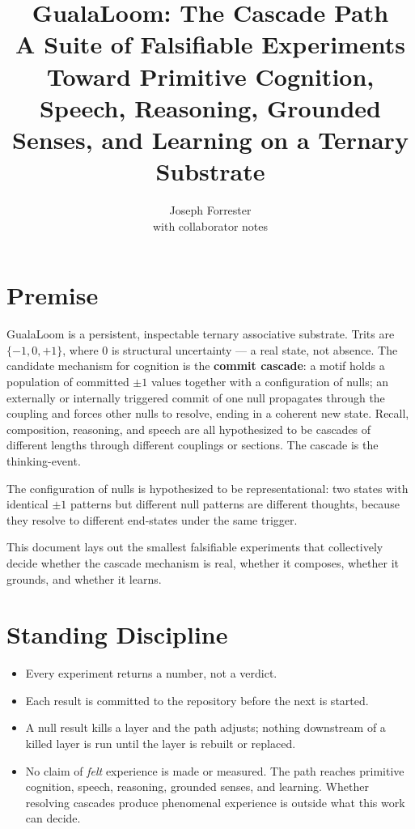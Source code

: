 \documentclass[11pt]{article}
\title{GualaLoom: The Cascade Path \\
\large A Suite of Falsifiable Experiments Toward Primitive Cognition,\\
Speech, Reasoning, Grounded Senses, and Learning on a Ternary Substrate}
\author{Joseph Forrester\\
\small with collaborator notes}
\date{}
\begin{document}
\maketitle

\section*{Premise}

GualaLoom is a persistent, inspectable ternary associative substrate.
Trits are $\{-1, 0, +1\}$, where $0$ is structural uncertainty --- a real
state, not absence. The candidate mechanism for cognition is the
\textbf{commit cascade}: a motif holds a population of committed
$\pm 1$ values together with a configuration of nulls; an externally or
internally triggered commit of one null propagates through the coupling
and forces other nulls to resolve, ending in a coherent new state.
Recall, composition, reasoning, and speech are all hypothesized to be
cascades of different lengths through different couplings or sections.
The cascade is the thinking-event.

The configuration of nulls is hypothesized to be representational:
two states with identical $\pm 1$ patterns but different null patterns
are different thoughts, because they resolve to different end-states
under the same trigger.

This document lays out the smallest falsifiable experiments that
collectively decide whether the cascade mechanism is real, whether it
composes, whether it grounds, and whether it learns.

\section*{Standing Discipline}

\begin{itemize}[leftmargin=*]
\item Every experiment returns a number, not a verdict.
\item Each result is committed to the repository before the next is
      started.
\item A null result kills a layer and the path adjusts; nothing
      downstream of a killed layer is run until the layer is rebuilt
      or replaced.
\item No claim of \emph{felt} experience is made or measured. The path
      reaches primitive cognition, speech, reasoning, grounded senses,
      and learning. Whether resolving cascades produce phenomenal
      experience is outside what this work can decide.
\end{itemize}
\end{document}
